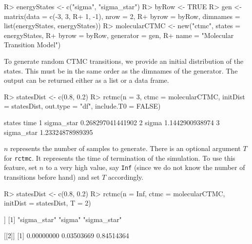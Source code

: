 \documentclass[
  nojss]{jss}
\begin{document}
\begin{CodeChunk}

\begin{CodeInput}
R> energyStates <- c("sigma", "sigma_star")
R> byRow <- TRUE
R> gen <- matrix(data = c(-3, 3,
R+                        1, -1), nrow = 2,
R+               byrow = byRow, dimnames = list(energyStates, energyStates))
R> molecularCTMC <- new("ctmc", states = energyStates, 
R+                  byrow = byRow, generator = gen, 
R+                  name = "Molecular Transition Model")      
\end{CodeInput}
\end{CodeChunk}

To generate random CTMC transitions, we provide an initial distribution of the states. This must be in the same order as the dimnames of the generator. The output can be returned either as a list or a data frame.

\begin{CodeChunk}

\begin{CodeInput}
R> statesDist <- c(0.8, 0.2)
R> rctmc(n = 3, ctmc = molecularCTMC, initDist = statesDist, out.type = "df", include.T0 = FALSE)
\end{CodeInput}

\begin{CodeOutput}
      states              time
1 sigma_star 0.268297041441902
2      sigma   1.1442900938974
3 sigma_star  1.23324878989395
\end{CodeOutput}
\end{CodeChunk}

\(n\) represents the number of samples to generate. There is an optional argument \(T\) for \texttt{rctmc}. It represents the time of termination of the simulation. To use this feature, set \(n\) to a very high value, say \texttt{Inf} (since we do not know the number of transitions before hand) and set \(T\) accordingly.

\begin{CodeChunk}

\begin{CodeInput}
R> statesDist <- c(0.8, 0.2)
R> rctmc(n = Inf, ctmc = molecularCTMC, initDist = statesDist, T = 2)
\end{CodeInput}

\begin{CodeOutput}
[[1]]
[1] "sigma_star" "sigma"      "sigma_star"

[[2]]
[1] 0.00000000 0.03503669 0.84514364
\end{CodeOutput}
\end{CodeChunk}
\end{document}
